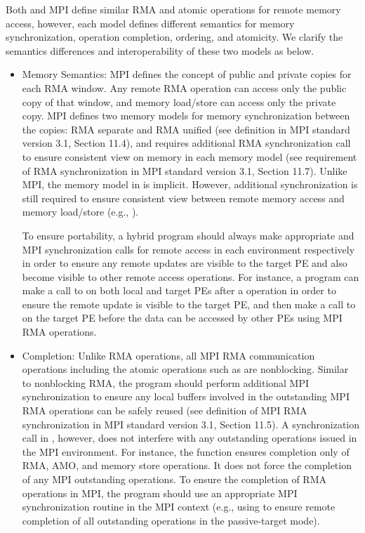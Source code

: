 Both \openshmem and MPI define similar RMA and atomic operations for remote memory 
access, however, each model defines different semantics for memory synchronization,
operation completion, ordering, and atomicity.
We clarify the semantics differences and interoperability of these two models 
as below.

\begin{itemize}

\item Memory Semantics: MPI defines the concept of public and private copies
for each RMA window. Any remote RMA operation can access only the
public copy of that window, and memory load\slash store can access only the
private copy. MPI defines two memory models for memory
synchronization between the copies: RMA separate and RMA unified (see definition
in MPI standard version 3.1, Section 11.4), and requires additional RMA
synchronization call to ensure consistent view on memory in each memory model
(see requirement of RMA synchronization in MPI standard version 3.1, Section 11.7).
Unlike MPI, the memory model in \openshmem is implicit.
However, additional synchronization is still required to ensure consistent view
between remote memory access and memory load\slash store (e.g., ).

To ensure portability, a hybrid program should always make appropriate \openshmem
and MPI synchronization calls for remote access in each environment respectively
in order to ensure any remote updates are visible to the target PE
and also become visible to other remote access operations. For instance, a program
can make a call to  on both local and target PEs after
a  operation in order to ensure the remote update is visible to
the target PE, and then make a call to  on the target
PE before the data can be accessed by other PEs using MPI RMA operations.

\item Completion: Unlike \openshmem RMA operations, all MPI RMA communication
operations including the atomic operations such as  are
nonblocking. Similar to \openshmem nonblocking RMA, the program should perform
additional MPI synchronization to ensure any local buffers involved in the outstanding
MPI RMA operations can be safely reused (see definition of MPI RMA synchronization
in MPI standard version 3.1, Section 11.5).
A synchronization call in \openshmem, however, does not interfere
with any outstanding operations issued in the MPI environment. For instance,
the  function ensures completion only of \openshmem RMA,
AMO, and memory store operations. It does not force the completion
of any MPI outstanding operations. To ensure the completion of RMA operations
in MPI, the program should use an appropriate MPI synchronization routine in the
MPI context (e.g., using  to ensure remote completion
of all outstanding operations in the passive-target mode).


\end{itemize}
